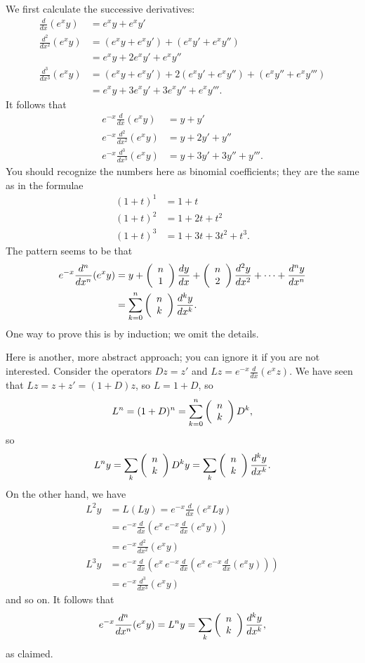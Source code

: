 \documentclass[a4paper]{amsart}
\theoremstyle{definition}
\newenvironment{solution}{{\noindent \bf Solution:}}{}
\begin{document}
\begin{solution}
We first calculate the successive derivatives:
 \begin{align*}
  \frac{d}{dx}(e^x y) &=
   e^x y + e^x y' \\ 
  \frac{d^2}{dx^2}(e^x y) &= 
   (e^x y + e^x y') + (e^x y' + e^x y'') \\
   &= e^x y + 2 e^x y' + e^x y'' \\
  \frac{d^3}{dx^3}(e^x y) &= 
   (e^x y + e^x y') + 2(e^x y' + e^x y'') + (e^x y'' + e^x y''') \\
   &= e^x y + 3 e^x y' + 3 e^x y'' + e^x y'''.
 \end{align*}
 It follows that
 \begin{align*}
  e^{-x}\frac{d}{dx}(e^x y)     &= y + y' \\
  e^{-x}\frac{d^2}{dx^2}(e^x y) &= y + 2y' + y'' \\
  e^{-x}\frac{d^3}{dx^3}(e^x y) &= y + 3y' + 3y'' + y'''.
 \end{align*}
 You should recognize the numbers here as binomial coefficients; they
 are the same as in the formulae
 \begin{align*}
  (1+t)^1 &= 1 + t \\
  (1+t)^2 &= 1 + 2t + t^2 \\
  (1+t)^3 &= 1 + 3t + 3t^2 + t^3.
 \end{align*}
 The pattern seems to be that
 \begin{align*}
  e^{-x}\frac{d^n}{dx^n}(e^x y) &= 
   y + \left(\begin{array}{c}{n}\\{1}\end{array}\right) \frac{dy}{dx} + \left(\begin{array}{c}{n}\\{2}\end{array}\right) \frac{d^2y}{dx^2} + 
    \cdots + \frac{d^ny}{dx^n} \\
   &= \sum_{k=0}^n \left(\begin{array}{c}{n}\\{k}\end{array}\right) \frac{d^ky}{dx^k}.
 \end{align*}
 One way to prove this is by induction; we omit the details.  

 Here is another, more abstract approach; you can ignore it if you are
 not interested.  Consider the operators $Dz=z'$ and
 $Lz=e^{-x}\frac{d}{dx}(e^xz)$.  We have seen that $Lz=z+z'=(1+D)z$,
 so $L=1+D$, so 
 \[ L^n=(1+D)^n = \sum_{k=0}^n \left(\begin{array}{c}{n}\\{k}\end{array}\right) D^k, \]
 so
 \[ L^ny = \sum_k \left(\begin{array}{c}{n}\\{k}\end{array}\right) D^ky = 
     \sum_k \left(\begin{array}{c}{n}\\{k}\end{array}\right)\frac{d^ky}{dx^k}.
 \]
 On the other hand, we have
 \begin{align*}
  L^2y &= L(Ly) = e^{-x}\frac{d}{dx}(e^xLy) \\
       &= e^{-x}\frac{d}{dx}\left(
           {e^x\, e^{-x}}\frac{d}{dx}\left(e^x y\right)\right) \\
       &= e^{-x}\frac{d^2}{dx^2}(e^xy) \\
  L^3y &= e^{-x} \frac{d}{dx}\left( {e^x \, e^{-x}}
                 \frac{d}{dx}\left( {e^x \, e^{-x}}
                 \frac{d}{dx}\left( e^x y \right)\right)\right) \\
       &= e^{-x} \frac{d^3}{dx^3}(e^xy)
 \end{align*}
 and so on.  It follows that
 \[ e^{-x}\frac{d^n}{dx^n}(e^x y) = L^ny = 
         \sum_k \left(\begin{array}{c}{n}\\{k}\end{array}\right) \frac{d^ky}{dx^k},
 \]
 as claimed.
\end{solution}
\end{document}
